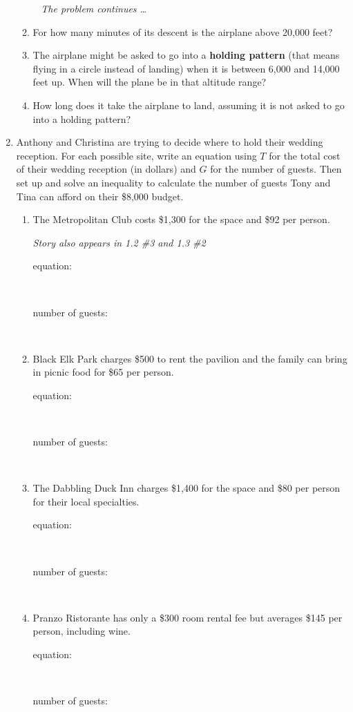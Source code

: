 \begin{enumerate}
\begin{enumerate}
\newpage %
~\hspace{-.5in} \emph{The problem continues \ldots}

\item For how many minutes of its descent is the airplane above 20,000 feet? \vfill
\item The airplane might be asked to go into a \textbf{holding pattern} (that means flying in a circle instead of landing) when it is between 6,000 and 14,000 feet up.  When will the plane be in that altitude range? \vfill
\item How long does it take the airplane to land, assuming it is not asked to go into a holding pattern? \vfill
\end{enumerate}

\newpage %

\item Anthony and Christina are trying to decide where to hold their wedding reception.  For each possible site, write an equation using $T$ for the total cost of their wedding reception (in dollars) and $G$ for the number of guests.  Then set up and solve an inequality to calculate the number of guests Tony and Tina can afford on their \$8,000 budget.  
\begin{enumerate}
\item The Metropolitan Club costs \$1,300 for the space and \$92 per person.
 
\hfill \emph{Story also appears in 1.2 \#3 and 1.3 \#2} \bigskip
\begin{description}
\item [equation:] ~\bigskip 
\item [number of guests:]  ~\vfill 
\end{description}  \bigskip
\item Black Elk Park charges  \$500 to rent the pavilion and the family can bring in picnic food for  \$65 per person. \bigskip
\begin{description}
\item [equation:] ~\bigskip 
\item [number of guests:]  ~\vfill 
\end{description}  \bigskip
\item The Dabbling Duck Inn charges  \$1,400 for the space and \$80 per person for their local specialties.  \bigskip
\begin{description}
\item [equation:] ~\bigskip 
\item [number of guests:]  ~\vfill 
\end{description}  \bigskip
\item Pranzo Ristorante has only a \$300 room rental fee but averages \$145 per person, including wine. \bigskip
\begin{description}
\item [equation:] ~\bigskip 
\item [number of guests:]  ~\vfill 
\end{description}  \bigskip
\end{enumerate}


\end{enumerate}
